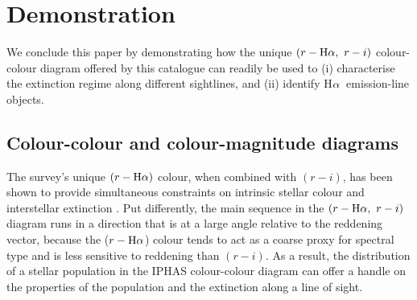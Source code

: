 \documentclass[a4paper,useAMS,usenatbib]{mn2e}
\def\ha{\mbox{H$\rm \alpha$}}
\begin{document}
\section{Demonstration}
\label{sec:demonstration}

We conclude this paper by demonstrating how the unique
$(r-\ha,\ r-i)$ colour-colour diagram offered by this catalogue
can readily be used to
(i) characterise the extinction regime along different sightlines, and
(ii) identify \ha\ emission-line objects.

\subsection{Colour-colour and colour-magnitude diagrams}

The survey's unique $(r-\ha)$ colour,
when combined with $(r-i)$,
has been shown to provide simultaneous constraints 
on intrinsic stellar colour and interstellar extinction \citep{Drew2008}. 
Put differently, the main sequence in the $(r-\ha,\ r-i)$ diagram
runs in a direction that is at a large angle relative to the reddening vector,
because the ($r-\ha$) colour tends to act
as a coarse proxy for spectral type
and is less sensitive to reddening than $(r-i)$.
As a result, the distribution of a stellar population
in the IPHAS colour-colour diagram
can offer a handle on the properties of the population
and the extinction along a line of sight.
\end{document}
